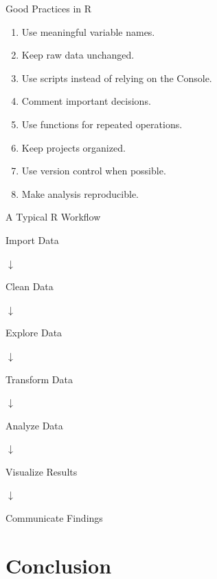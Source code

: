 \documentclass[aspectratio=169,11pt]{beamer}
\begin{document}
	\begin{frame}{Good Practices in R}
		
		\begin{enumerate}
			\item Use meaningful variable names.
			\item Keep raw data unchanged.
			\item Use scripts instead of relying on the Console.
			\item Comment important decisions.
			\item Use functions for repeated operations.
			\item Keep projects organized.
			\item Use version control when possible.
			\item Make analysis reproducible.
		\end{enumerate}
		
	\end{frame}
	
	
	
	
	\begin{frame}{A Typical R Workflow}
		
		\begin{center}
			
			\large
			Import Data
			
			$\downarrow$
			
			Clean Data
			
			$\downarrow$
			
			Explore Data
			
			$\downarrow$
			
			Transform Data
			
			$\downarrow$
			
			Analyze Data
			
			$\downarrow$
			
			Visualize Results
			
			$\downarrow$
			
			Communicate Findings
			
		\end{center}
		
	\end{frame}
	
	
	
	\section{Conclusion}
	
\end{document}
